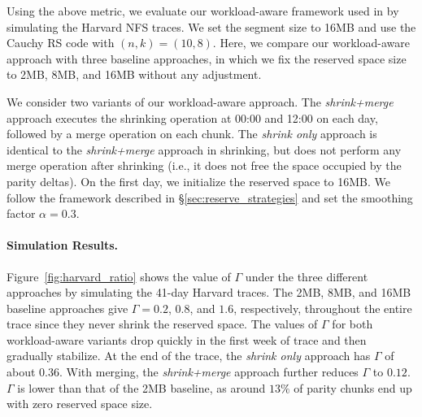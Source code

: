 Using the above metric, we evaluate our workload-aware framework used in \PLR
by simulating the Harvard NFS traces. We set the segment size to 16MB and
use the Cauchy RS code \cite{blomer95} with $(n,k)=(10,8)$. 
Here, we compare our workload-aware approach with three baseline approaches,
in which we fix the reserved space size to 2MB, 8MB, and 16MB without
any adjustment.

We consider two variants of our workload-aware approach. The
\textit{shrink+merge} approach executes the shrinking operation at 00:00 and
12:00 on each day, followed by a merge operation on each chunk. The
\textit{shrink only} approach is identical to the \textit{shrink+merge}
approach in shrinking, but does not perform any merge operation after
shrinking (i.e., it does not free the space occupied by the parity deltas).
On the first day, we initialize the reserved space to 16MB.  We follow the
framework described in \S\ref{sec:reserve_strategies} and set the smoothing
factor $\alpha = 0.3$.


\paragraph{Simulation Results.} Figure~\ref{fig:harvard_ratio} shows the value
of $\Gamma$ under the three different approaches by simulating the 41-day
Harvard traces.  The 2MB, 8MB, and 16MB baseline approaches give 
$\Gamma=0.2$, $0.8$, and $1.6$, respectively, throughout the entire trace
since they never shrink the reserved space.  The values of $\Gamma$ for both
workload-aware variants drop quickly in the first week of trace and then
gradually stabilize.  At the end of the trace, the \textit{shrink only}
approach has $\Gamma$ of about $0.36$.  With merging, the
\textit{shrink+merge} approach further reduces $\Gamma$ to $0.12$. $\Gamma$ is
lower than that of the 2MB baseline, as around $13\%$ of parity chunks end up
with zero reserved space size.

